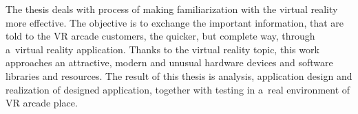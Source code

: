 The thesis deals with process of making familiarization with the virtual
reality more effective. The objective is to exchange the important
information, that are told to the VR arcade customers, the quicker, but
complete way, through a~virtual reality application. Thanks to the
virtual reality topic, this work approaches an attractive, modern and
unusual hardware devices and software libraries and resources. The
result of this thesis is analysis, application design and realization of
designed application, together with testing in a~real environment of VR
arcade place.
